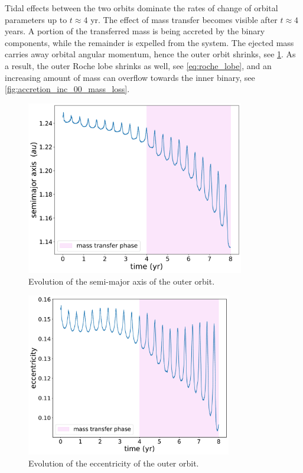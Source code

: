 Tidal effects between the two orbits dominate the rates of change of orbital parameters up to $t \approx 4$ yr. The effect of mass transfer becomes visible after $t \approx 4$ years. A portion of the transferred mass is being accreted by the binary components, while the remainder is expelled from the system.  The ejected mass carries away orbital angular momentum, hence the outer orbit shrinks, see \cref{fig:accretion_inc_00_outer_semimajor_axis}. As a result,  the outer Roche lobe shrinks as well, see \cref{eq:roche_lobe}, and an increasing amount of mass can overflow towards the inner binary, see \cref{fig:accretion_inc_00_mass_loss}. 
\begin{figure}[H]
    \centering
    \includegraphics[width=0.85\textwidth]{Thesis/graphs/inc_00/accretion_outer_inc_00_semimajor_axis.pdf}
    \caption{Evolution of the semi-major axis of the outer orbit.}
    \label{fig:accretion_inc_00_outer_semimajor_axis}
\end{figure}
\begin{figure}[H]
    \centering
    \includegraphics[width=0.8\textwidth]{Thesis/graphs/inc_00/accretion_inc_00_outer_ecc.pdf}
    \caption{Evolution of the eccentricity of the outer orbit.}
    \label{fig:accretion_inc_00_outer_ecc}
\end{figure}
